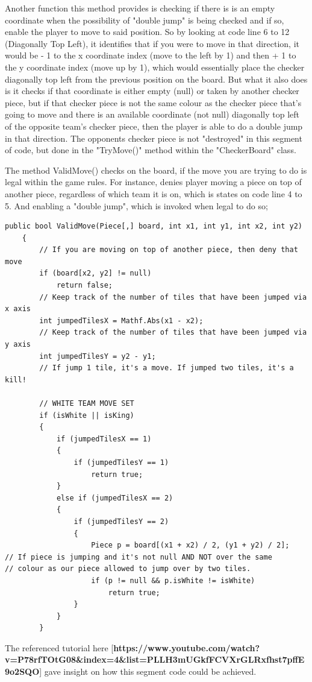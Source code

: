 \documentclass[10pt, a4paper]{article}
\begin{document}
	Another function this method provides is checking if there is is an empty coordinate when the possibility of "double jump" is being checked and if so, enable the player to move to said position. So by looking at code line 6 to 12 (Diagonally Top Left), it identifies that if you were to move in that direction, it would be - 1 to the x coordinate index (move to the left by 1) and then + 1 to the y coordinate index (move up by 1), which would essentially place the checker diagonally top left from the previous position on the board. But what it also does is it checks if that coordinate is either empty (null) or taken by another checker piece, but if that checker piece is not the same colour as the checker piece that's going to move and there is an available coordinate (not null) diagonally top left of the opposite team's checker piece, then the player is able to do a double jump in that direction. The opponents checker piece is not "destroyed" in this segment of code, but done in the "TryMove()" method within the "CheckerBoard" class.
	
	The method ValidMove() checks on the board, if the move you are trying to do is legal within the game rules. For instance, denies player moving a piece on top of another piece, regardless of which team it is on, which is states on code line 4 to 5. And enabling a "double jump", which is invoked when legal to do so;
	
	\begin{lstlisting}[caption = ValidMove()]
	 public bool ValidMove(Piece[,] board, int x1, int y1, int x2, int y2)
    {
        // If you are moving on top of another piece, then deny that move
        if (board[x2, y2] != null)
            return false;
        // Keep track of the number of tiles that have been jumped via x axis
        int jumpedTilesX = Mathf.Abs(x1 - x2);
        // Keep track of the number of tiles that have been jumped via y axis
        int jumpedTilesY = y2 - y1;
        // If jump 1 tile, it's a move. If jumped two tiles, it's a kill!
        
        // WHITE TEAM MOVE SET
        if (isWhite || isKing)
        {
            if (jumpedTilesX == 1)
            {
                if (jumpedTilesY == 1)
                    return true;
            }
            else if (jumpedTilesX == 2)
            {
                if (jumpedTilesY == 2)
                {
                    Piece p = board[(x1 + x2) / 2, (y1 + y2) / 2];
// If piece is jumping and it's not null AND NOT over the same
// colour as our piece allowed to jump over by two tiles.
                    if (p != null && p.isWhite != isWhite)
                        return true;
                }
            }
        }
	\end{lstlisting}
	The referenced tutorial here [\textbf{https://www.youtube.com/watch?v=P78rfTOtG08&index=4&list=PLLH3mUGkfFCVXrGLRxfhst7pffE9o2SQO}] gave insight on how this segment code could be achieved.
	
\end{document}
